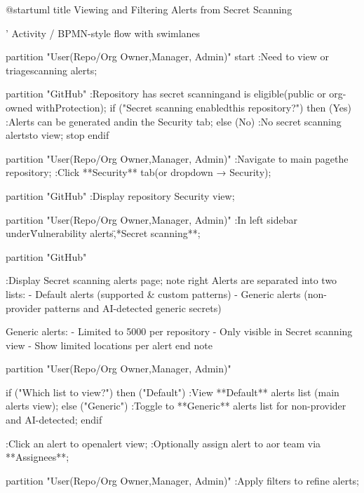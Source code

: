 @startuml
title Viewing and Filtering Alerts from Secret Scanning

' Activity / BPMN-style flow with swimlanes

partition "User\n(Repo/Org Owner,\nSecurity Manager, Admin)" {
  start
  :Need to view or triage\nsecret scanning alerts;
}

partition "GitHub" {
  :Repository has secret scanning\nenabled and is eligible\n(public or org-owned with\nSecret Protection);
  if ("Secret scanning enabled\nfor this repository?") then (Yes)
    :Alerts can be generated and\nshown in the Security tab;
  else (No)
    :No secret scanning alerts\navailable to view;
    stop
  endif
}

partition "User\n(Repo/Org Owner,\nSecurity Manager, Admin)" {
  :Navigate to main page\nof the repository;
  :Click **Security** tab\n(or dropdown → Security);
}

partition "GitHub" {
  :Display repository Security view;
}

partition "User\n(Repo/Org Owner,\nSecurity Manager, Admin)" {
  :In left sidebar under\n\"Vulnerability alerts\",\nclick **Secret scanning**;
}

partition "GitHub" {
  :Display Secret scanning alerts page;
  note right
    Alerts are separated into two lists:
    - Default alerts (supported & custom patterns)
    - Generic alerts (non-provider patterns
      and AI-detected generic secrets)

    Generic alerts:
    - Limited to 5000 per repository
    - Only visible in Secret scanning view
    - Show limited locations per alert
  end note
}

partition "User\n(Repo/Org Owner,\nSecurity Manager, Admin)" {
  if ("Which list to view?") then ("Default")
    :View **Default** alerts list
     (main alerts view);
  else ("Generic")
    :Toggle to **Generic** alerts list
     for non-provider and AI-detected\nsecrets;
  endif

  :Click an alert to open\ndetailed alert view;
  :Optionally assign alert to a\nuser or team via **Assignees**;
}

partition "User\n(Repo/Org Owner,\nSecurity Manager, Admin)" {
  :Apply filters to refine alerts;
}


